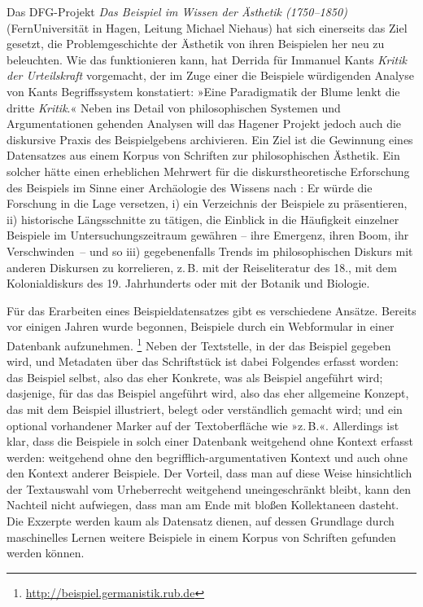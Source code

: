 \documentclass{article}
\newcommand*{\lit}{\textit}%
\begin{document}
Das DFG-Projekt \textit{Das Beispiel im Wissen der Ästhetik
  (1750--1850)} (Fern\-Uni\-versi\-tät in Hagen, Leitung Michael Niehaus)
hat sich einerseits das Ziel gesetzt, die Problemgeschichte der
Ästhetik von ihren Beispielen her neu zu beleuchten. Wie das
funktionieren kann, hat Derrida für Immanuel Kants \lit{Kritik der
  Urteilskraft} vorgemacht, der im Zuge einer die Beispiele
würdigenden Analyse von Kants Begriffssystem konstatiert: »Eine
Paradigmatik der Blume lenkt die dritte
\emph{Kritik}.« \Parencite[107]{Derrida1992} Neben ins Detail von
philosophischen Systemen und Argumentationen gehenden Analysen will
das Hagener Projekt jedoch auch die diskursive Praxis des
Beispielgebens archivieren. Ein Ziel ist die Gewinnung eines
Datensatzes aus einem Korpus von Schriften zur philosophischen
Ästhetik. Ein solcher hätte einen erheblichen Mehrwert für die
diskurstheoretische Erforschung des Beispiels im Sinne einer
Archäologie des Wissens nach \textcite{Fouc1997a}: Er würde die
Forschung in die Lage versetzen, i) ein Verzeichnis der Beispiele zu
präsentieren, ii) historische Längsschnitte zu tätigen, die Einblick
in die Häufigkeit einzelner Beispiele im Untersuchungszeitraum
gewähren -- ihre Emergenz, ihren Boom, ihr Verschwinden~-- und so iii)
gegebenenfalls Trends im philosophischen Diskurs mit anderen Diskursen
zu korrelieren, z.\,B. mit der Reiseliteratur des 18., mit dem
Kolonialdiskurs des 19. Jahrhunderts oder mit der Botanik und
Biologie.


Für das Erarbeiten eines Beispieldatensatzes gibt es verschiedene
Ansätze. Bereits vor einigen Jahren wurde begonnen, Beispiele durch
ein Webformular in einer Datenbank aufzunehmen.%
\footnote{\url{http://beispiel.germanistik.rub.de}} %
Neben der Textstelle, in der das Beispiel gegeben wird, und Metadaten
über das Schriftstück ist dabei Folgendes erfasst worden: das Beispiel
selbst, also das eher Konkrete, was als Beispiel angeführt wird;
dasjenige, für das das Beispiel angeführt wird, also das eher
allgemeine Konzept, das mit dem Beispiel illustriert, belegt oder
verständlich gemacht wird; und ein optional vorhandener Marker auf der
Textoberfläche wie »z.\,B.«. Allerdings ist klar, dass die Beispiele
in solch einer Datenbank weitgehend ohne Kontext erfasst werden:
weitgehend ohne den begrifflich-argumentativen Kontext und auch ohne
den Kontext anderer Beispiele. Der Vorteil, dass man auf diese Weise
hinsichtlich der Textauswahl vom Urheberrecht weitgehend
uneingeschränkt bleibt, kann den Nachteil nicht aufwiegen, dass man am
Ende mit bloßen Kollektaneen dasteht. Die Exzerpte werden kaum als
Datensatz dienen, auf dessen Grundlage durch maschinelles Lernen
weitere Beispiele in einem Korpus von Schriften gefunden werden
können.
\end{document}
